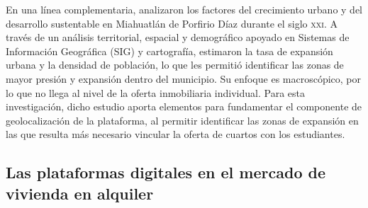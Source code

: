 En una línea complementaria, \textcite{AvilaFlores2020} analizaron los factores del crecimiento urbano y del desarrollo sustentable en Miahuatlán de Porfirio Díaz durante el siglo \textsc{xxi}. A través de un análisis territorial, espacial y demográfico apoyado en Sistemas de Información Geográfica (SIG) y cartografía, estimaron la tasa de expansión urbana y la densidad de población, lo que les permitió identificar las zonas de mayor presión y expansión dentro del municipio. Su enfoque es macroscópico, por lo que no llega al nivel de la oferta inmobiliaria individual. Para esta investigación, dicho estudio aporta elementos para fundamentar el componente de geolocalización de la plataforma, al permitir identificar las zonas de expansión en las que resulta más necesario vincular la oferta de cuartos con los estudiantes.

\subsection{Las plataformas digitales en el mercado de vivienda en alquiler}


\subsection[Confianza y verificación en plataformas entre particulares]{}

